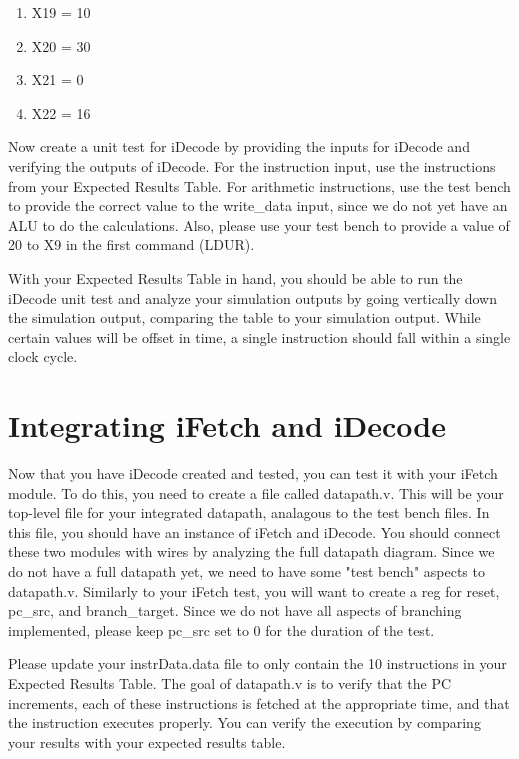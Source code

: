 \begin{enumerate}
	\item X19 = 10
	\item X20 = 30
	\item X21 = 0
	\item X22 = 16
\end{enumerate}

Now create a unit test for iDecode by providing the inputs for iDecode and verifying the outputs of iDecode.  For the instruction input, use the instructions from your Expected Results Table.  For arithmetic instructions, use the test bench to provide the correct value to the write\_data input, since we do not yet have an ALU to do the calculations.  Also, please use your test bench to provide a value of 20 to X9 in the first command (LDUR).

With your Expected Results Table in hand, you should be able to run the iDecode unit test and analyze your simulation outputs by going vertically down the simulation output, comparing the table to your simulation output.  While certain values will be offset in time, a single instruction should fall within a single clock cycle.  

\section{Integrating iFetch and iDecode}
Now that you have iDecode created and tested, you can test it with your iFetch module.  To do this, you need to create a file called datapath.v.  This will be your top-level file for your integrated datapath, analagous to the test bench files.  In this file, you should have an instance of iFetch and iDecode.  You should connect these two modules with wires by analyzing the full datapath diagram.  Since we do not have a full datapath yet, we need to have some "test bench" aspects to datapath.v.  Similarly to your iFetch test, you will want to create a reg for reset, pc\_src, and branch\_target.  Since we do not have all aspects of branching implemented, please keep pc\_src set to 0 for the duration of the test.  

Please update your instrData.data file to only contain the 10 instructions in your Expected Results Table.  The goal of datapath.v is to verify that the PC increments, each of these instructions is fetched at the appropriate time, and that the instruction executes properly.  You can verify the execution by comparing your results with your expected results table.     

